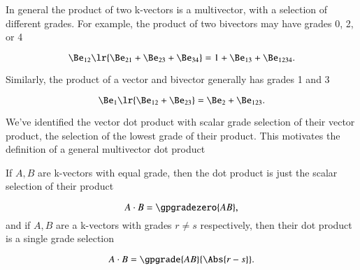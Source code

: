%
%

In general the product of two k-vectors is a multivector, with a selection of different grades.
For example, the product of two bivectors may have grades 0, 2, or 4

\begin{dmath}\label{eqn:generalizedDot:601}
\Be_{12} \lr{ \Be_{21} + \Be_{23} + \Be_{34} }
=
1 + \Be_{13} + \Be_{1234}.
\end{dmath}

Similarly,
the product of a vector and bivector generally has grades 1 and 3

\begin{dmath}\label{eqn:generalizedDot:621}
\Be_1 \lr{ \Be_{12} + \Be_{23} }
=
\Be_2 + \Be_{123}.
\end{dmath}

We've identified the vector dot product with scalar grade selection of their vector product, the selection of the lowest grade of their product.
This motivates the definition of a general multivector dot product


If \( A, B \) are k-vectors with equal grade, then the dot product is just the scalar selection of their product

\begin{dmath}\label{eqn:generalizedDot:580}
A \cdot B = \gpgradezero{ A B },
\end{dmath}
and if \( A, B \) are a k-vectors with grades \( r \ne s \) respectively, then their dot product is a single grade selection

\begin{dmath}\label{eqn:generalizedDot:581}
A \cdot B = \gpgrade{ A B }{\Abs{r - s}}.
\end{dmath}

